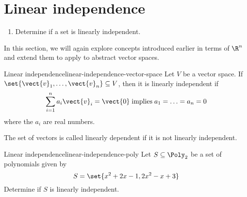 \section{Linear independence}

\begin{outcome}
  \begin{enumerate}
  \item Determine if a set is linearly independent.
  \end{enumerate}
\end{outcome}

In this section, we will again explore concepts introduced earlier in terms of $\R^n$ and extend them to apply to abstract vector spaces. 

\begin{definition}{Linear independence}{linear-independence-vector-space}
Let $V$ be a vector space. If $\set{\vect{v}_{1},\ldots,\vect{v}_{n}} \subseteq V$, then it is linearly independent
 if
\begin{equation*}
\sum_{i=1}^{n}a_{i}\vect{v}_{i}=\vect{0} \;\mbox{implies}\;
a_{1}=\ldots =a_{n}=0
\end{equation*}
where the $a_i$ are real numbers. 
\end{definition}

The
set of vectors is called linearly dependent if it is not linearly independent.

\begin{example}{Linear independence}{linear-independence-poly}
Let $S \subseteq \Poly_2$ be a set of polynomials given by
\[
S = \set{x^2 + 2x - 1, 2x^2 - x + 3 }
\]
Determine if $S$ is linearly independent. 
\end{example}

